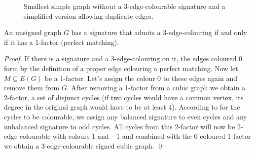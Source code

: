 \begin{figure}[h]
    \hspace{0.1\textwidth}

    \caption[Smallest simple graph without a 3-edge-colourable signature]{Smallest simple graph without a 3-edge-colourable signature and a simplified version allowing duplicate edges.}
\end{figure}

\begin{theorem}
    An unsigned graph $G$ has a signature that admits a 3-edge-colouring if and only if it has a 1-factor (perfect matching).
\end{theorem}

\textit{Proof.} If there is a signature and a 3-edge-colouring on it, the edges coloured $0$ form by the definition of a proper edge colouring a perfect matching. Now let $M \subseteq E(G)$ be a 1-factor. Let's assign the colour $0$ to these edges again and remove them from $G$. After removing a 1-factor from a cubic graph we obtain a 2-factor, a set of disjunct cycles (if two cycles would have a common vertex, its degree in the original graph would have to be at least 4). According to  for the cycles to be colourable, we assign any balanced signature to even cycles and any unbalanced signature to odd cycles. All cycles from this 2-factor will now be 2-edge-colourable with colours $1$ and $-1$ and combined with the $0$-coloured 1-factor we obtain a 3-edge-colourable signed cubic graph. \qed

